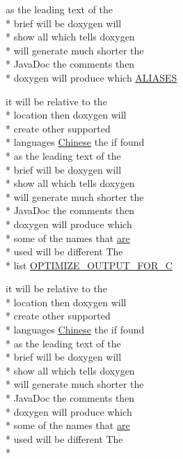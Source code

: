 \begin{DoxyCompactItemize}
as the leading text of the \\*
brief will be doxygen will \\*
show all which tells doxygen \\*
will generate much shorter the \\*
Java\-Doc the comments then \\*
doxygen will produce which \hyperlink{mkdoc_8dox_abb9f86499ee6f16a13b6e814f450db18}{A\-L\-I\-A\-S\-E\-S}
\item 
it will be relative to the \\*
location then doxygen will \\*
create other supported \\*
languages \hyperlink{mkdoc_8dox_ab6ff97d2e5e9fa61c208d5f0eee91c62}{Chinese} the if found \\*
as the leading text of the \\*
brief will be doxygen will \\*
show all which tells doxygen \\*
will generate much shorter the \\*
Java\-Doc the comments then \\*
doxygen will produce which \\*
some of the names that \hyperlink{mkdoc_8dox_a6d0965b20c4eb2235e8f9f5f0e5193ae}{are} \\*
used will be different The \\*
list \hyperlink{mkdoc_8dox_aa542a8f1572d888d9ecd0f903a299444}{O\-P\-T\-I\-M\-I\-Z\-E\-\_\-\-O\-U\-T\-P\-U\-T\-\_\-\-F\-O\-R\-\_\-\-C}
\item 
it will be relative to the \\*
location then doxygen will \\*
create other supported \\*
languages \hyperlink{mkdoc_8dox_ab6ff97d2e5e9fa61c208d5f0eee91c62}{Chinese} the if found \\*
as the leading text of the \\*
brief will be doxygen will \\*
show all which tells doxygen \\*
will generate much shorter the \\*
Java\-Doc the comments then \\*
doxygen will produce which \\*
some of the names that \hyperlink{mkdoc_8dox_a6d0965b20c4eb2235e8f9f5f0e5193ae}{are} \\*
used will be different The \\*

\end{DoxyCompactItemize}
